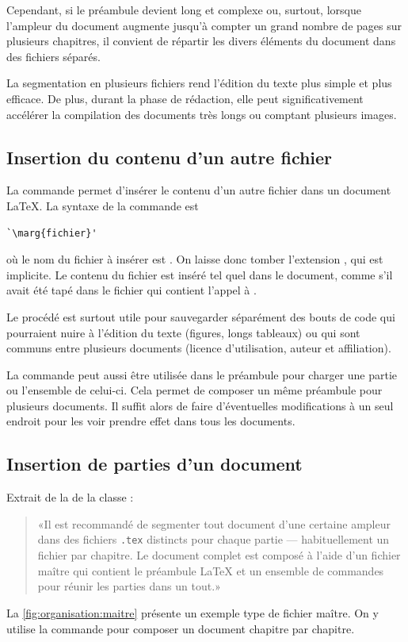 Cependant, si le préambule devient long et complexe ou, surtout,
lorsque l'ampleur du document augmente jusqu'à compter un grand nombre
de pages sur plusieurs chapitres, il convient de répartir les divers
éléments du document dans des fichiers séparés.

La segmentation en plusieurs fichiers rend l'édition du texte plus
simple et plus efficace. De plus, durant la phase de rédaction, elle
peut significativement accélérer la compilation des documents très
longs ou comptant plusieurs images.

\subsection{Insertion du contenu d'un autre fichier}
\label{sec:organisation:include:input}

La commande \cmd{} permet d'insérer le contenu d'un autre
fichier dans un document {\LaTeX}. La syntaxe de la commande est
\begin{lstlisting}
`\marg{fichier}'
\end{lstlisting}
où le nom du fichier à insérer est . On
laisse donc tomber l'extension , qui est implicite. Le
contenu du fichier est inséré tel quel dans le document, comme s'il
avait été tapé dans le fichier qui contient l'appel à \cmd{}.

Le procédé est surtout utile pour sauvegarder séparément des bouts de
code qui pourraient nuire à l'édition du texte (figures, longs
tableaux) ou qui sont communs entre plusieurs documents (licence
d'utilisation, auteur et affiliation).

La commande peut aussi être utilisée dans le préambule pour charger
une partie ou l'ensemble de celui-ci. Cela permet de composer un même
préambule pour plusieurs documents. Il suffit alors de faire
d'éventuelles modifications à un seul endroit pour les voir prendre
effet dans tous les documents.

\subsection{Insertion de parties d'un document}
\label{sec:organisation:include:include}

Extrait de la %
de la classe :
\begin{quote}
  «Il est recommandé de segmenter tout document d'une certaine ampleur
  dans des fichiers \verb=.tex= distincts pour chaque partie ---
  habituellement un fichier par chapitre. Le document complet est
  composé à l'aide d'un fichier maître qui contient le préambule
  {\LaTeX} et un ensemble de commandes \cmdprint{} pour réunir les
  parties dans un tout.»
\end{quote}
La \autoref{fig:organisation:maitre} présente un exemple type de
fichier maître. On y utilise la commande \cmd{} pour composer
un document chapitre par chapitre.

